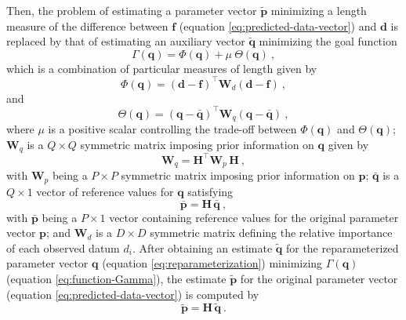 Then, the problem of estimating a parameter vector $\tilde{\mathbf{p}}$ minimizing a length 
measure of the difference between $\mathbf{f}$ (equation \ref{eq:predicted-data-vector}) and $\mathbf{d}$
is replaced by that of estimating an auxiliary vector $\tilde{\mathbf{q}}$ minimizing the goal function
\begin{equation}
	\Gamma(\mathbf{q}) = \Phi(\mathbf{q}) + \mu \: \Theta(\mathbf{q}) \: ,
	\label{eq:function-Gamma}
\end{equation}
which is a combination of particular measures of length given by
\begin{equation}
	\Phi(\mathbf{q}) = \left( \mathbf{d} - \mathbf{f} \right)^{\top}\mathbf{W}_{d}\left( \mathbf{d} - \mathbf{f} \right) \: ,
	\label{eq:function-Phi}
\end{equation}
and
\begin{equation}
	\Theta(\mathbf{q}) = \left( \mathbf{q} - \bar{\mathbf{q}} \right)^{\top}\mathbf{W}_{q}\left( \mathbf{q} - \bar{\mathbf{q}} \right) \: ,
	\label{eq:function-Theta}
\end{equation}
where $\mu$ is a positive scalar controlling the trade-off between $\Phi(\mathbf{q})$ and $\Theta(\mathbf{q})$; 
$\mathbf{W}_{q}$ is a $Q \times Q$ symmetric matrix imposing prior information on $\mathbf{q}$ given by
\begin{equation}
	\mathbf{W}_{q} = \mathbf{H}^{\top} \mathbf{W}_{p} \, \mathbf{H} \: ,
	\label{eq:weighting-matrix-q}
\end{equation}
with $\mathbf{W}_{p}$ being a $P \times P$ symmetric matrix imposing prior information on $\mathbf{p}$;
$\bar{\mathbf{q}}$ is a $Q \times 1$ vector of reference values for $\mathbf{q}$ satisfying
\begin{equation}
	\bar{\mathbf{p}} = \mathbf{H} \, \bar{\mathbf{q}} \: ,
	\label{eq:reparameterization-reference}
\end{equation}
with $\bar{\mathbf{p}}$ being a $P \times 1$ vector containing reference values
for the original parameter vector $\mathbf{p}$; and 
$\mathbf{W}_{d}$ is a $D \times D$ symmetric matrix defining the relative importance of each observed datum $d_{i}$.
After obtaining an estimate $\tilde{\mathbf{q}}$ for the reparameterized parameter vector $\mathbf{q}$ (equation \ref{eq:reparameterization}) minimizing
$\Gamma(\mathbf{q})$ (equation \ref{eq:function-Gamma}), the estimate $\tilde{\mathbf{p}}$ for the original parameter vector 
(equation \ref{eq:predicted-data-vector}) is computed by 
\begin{equation}
	\tilde{\mathbf{p}} = \mathbf{H} \, \tilde{\mathbf{q}} \: .
	\label{eq:vector-p-tilde}
\end{equation}

